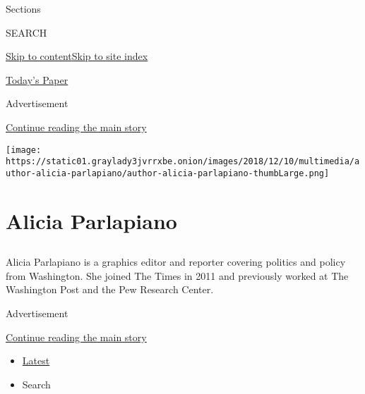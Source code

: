 Sections

SEARCH

\protect\hyperlink{site-content}{Skip to
content}\protect\hyperlink{site-index}{Skip to site index}

\href{https://myaccount.nytimes3xbfgragh.onion/auth/login?response_type=cookie\&client_id=vi}{}

\href{https://www.nytimes3xbfgragh.onion/section/todayspaper}{Today's
Paper}

Advertisement

\protect\hyperlink{after-top}{Continue reading the main story}

\texttt{[image: https://static01.graylady3jvrrxbe.onion/images/2018/12/10/multimedia/author-alicia-parlapiano/author-alicia-parlapiano-thumbLarge.png]}

\hypertarget{alicia-parlapiano}{%
\section{Alicia Parlapiano}\label{alicia-parlapiano}}

\subsection{}

Alicia Parlapiano is a graphics editor and reporter covering politics
and policy from Washington. She joined The Times in 2011 and previously
worked at The Washington Post and the Pew Research Center.

Advertisement

\protect\hyperlink{after-mid1}{Continue reading the main story}

\begin{itemize}
\tightlist
\item
  \protect\hyperlink{stream-panel}{Latest}
\item
  Search
\end{itemize}

